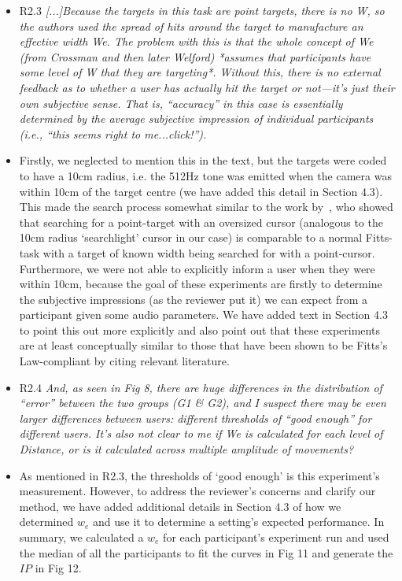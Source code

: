 \documentclass{scrartcl}
\begin{document}
\begin{itemize}
  \item R2.3 \textit{[...]Because the targets in this task are point targets, there is no W, so the authors used the spread of hits around the target to manufacture an effective width We. The problem with this is that the whole concept of We (from Crossman and then later Welford) *assumes that participants have some level of W that they are targeting*. Without this, there is no external feedback as to whether a user has actually hit the target or not—it’s just their own subjective sense. That is, ``accuracy'' in this case is essentially determined by the average subjective impression of individual participants (i.e., ``this seems right to me...click!'').  }
  \item[] Firstly, we neglected to mention this in the text, but the targets were coded to have a 10cm radius, i.e. the 512Hz tone was emitted when the camera was within 10cm of the target centre (we have added this detail in Section 4.3).
    This made the search process somewhat similar to the work by~\cite{kabbash1995prince}, who showed that searching for a point-target with an oversized cursor (analogous to the 10cm radius `searchlight' cursor in our case) is comparable to a normal Fitts-task with a target of known width being searched for with a point-cursor.
    Furthermore, we were not able to explicitly inform a user when they were within 10cm, because the goal of these experiments are firstly to determine the subjective impressions (as the reviewer put it) we can expect from a participant given some audio parameters.
    We have added text in Section 4.3 to point this out more explicitly and also point out that these experiments are at least conceptually similar to those that have been shown to be Fitts's Law-compliant by citing relevant literature. 

  \item R2.4 \textit{And, as seen in Fig 8, there are huge differences in the distribution of ``error'' between the two groups (G1 \& G2), and I suspect there may be even larger differences between users: different thresholds of ``good enough'' for different users. It’s also not clear to me if We is calculated for each level of Distance, or is it calculated across multiple amplitude of movements?}
  \item[] As mentioned in R2.3, the thresholds of `good enough' is this experiment's measurement.
    However, to address the reviewer's concerns and clarify our method, we have added additional details in Section 4.3 of how we determined $w_e$ and use it to determine a setting's expected performance. 
    In summary, we calculated a $w_e$ for each participant's experiment run and used the median of all the participants to fit the curves in Fig 11 and generate the $IP$ in Fig 12. 


\end{itemize}
\end{document}
